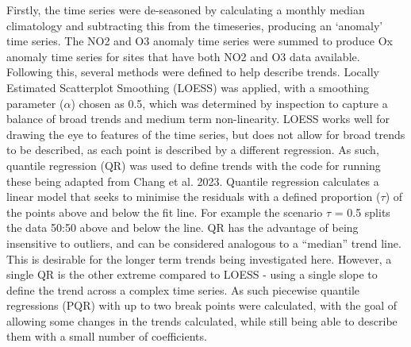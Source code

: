 \documentclass[journal abbreviation, manuscript]{copernicus}
\begin{document}
Firstly, the time series were de-seasoned by calculating a monthly median climatology and subtracting this from the timeseries, producing an ‘anomaly’ time series. The NO2 and O3 anomaly time series were summed to produce Ox anomaly time series for sites that have both NO2 and O3 data available. Following this, several methods were defined to help describe trends. Locally Estimated Scatterplot Smoothing (LOESS) was applied, with a smoothing parameter ($\alpha$) chosen as 0.5, which was determined by inspection to capture a balance of broad trends and medium term non-linearity. LOESS works well for drawing the eye to features of the time series, but does not allow for broad trends to be described, as each point is described by a different regression. As such, quantile regression (QR) was used to define trends with the code for running these being adapted from Chang et al. 2023. Quantile regression calculates a linear model that seeks to minimise the residuals with a defined proportion ($\tau$) of the points above and below the fit line. For example the scenario $\tau$ = 0.5 splits the data 50:50 above and below the line. QR has the advantage of being insensitive to outliers, and can be considered analogous to a “median” trend line. This is desirable for the longer term trends being investigated here. However, a single QR is the other extreme compared to LOESS - using a single slope to define the trend across a complex time series. As such piecewise quantile regressions (PQR) with up to two break points were calculated, with the goal of allowing some changes in the trends calculated, while still being able to describe them with a small number of coefficients.
\end{document}
